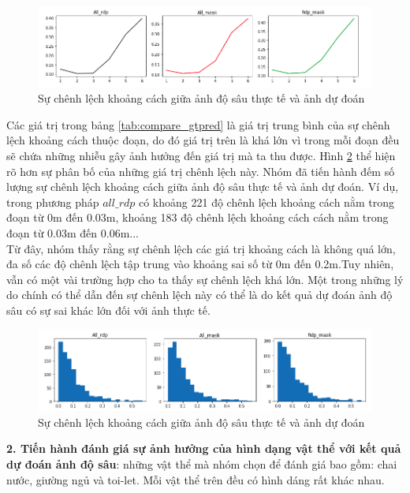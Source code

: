 \begin{center}
   \begin{figure}[H]
   \begin{center}
   \includegraphics[scale=0.55]{image/deviation}
   \end{center}
   \caption{Sự chênh lệch khoảng cách giữa ảnh độ sâu thực tế và ảnh dự đoán}
   \label{fig:deviation}
   \end{figure}
 \end{center}
 
 Các giá trị trong bảng \ref{tab:compare_gtpred} là giá trị trung bình của sự chênh lệch khoảng cách thuộc đoạn, do đó giá trị trên là khá lớn vì trong mỗi đoạn đều sẽ chứa những nhiễu gây ảnh hưởng đến giá trị mà ta thu được. Hình \ref{fig:distribution} thể hiện rõ hơn sự phân bố của những giá trị chênh lệch này. Nhóm đã tiến hành đếm số lượng sự chênh lệch khoảng cách giữa ảnh độ sâu thực tế và ảnh dự đoán.  Ví dụ, trong phương pháp $all\_rdp$ có khoảng 221 độ chênh lệch khoảng cách nằm trong đoạn từ 0m đến 0.03m, khoảng 183 độ chênh lệch khoảng cách cách nằm trong đoạn từ 0.03m đến 0.06m... \\
 
 Từ đây, nhóm thấy rằng sự chênh lệch các giá trị khoảng cách là không quá lớn, đa số các độ chênh lệch tập trung vào khoảng sai số từ 0m đến 0.2m.Tuy nhiên, vẫn có một vài trường hợp cho ta thấy sự chênh lệch khá lớn. Một trong những lý do chính có thể dẫn đến sự chênh lệch này có thể là do kết quả dự đoán ảnh độ sâu có sự sai khác lớn đối với ảnh thực tế.
 \begin{center}
   \begin{figure}[H]
   \begin{center}
   \includegraphics[scale=0.55]{image/distribution}
   \end{center}
   \caption{Sự chênh lệch khoảng cách giữa ảnh độ sâu thực tế và ảnh dự đoán}
   \label{fig:distribution}
   \end{figure}
 \end{center} 
 \hspace{.2cm}\textbf{2. Tiến hành đánh giá sự ảnh hưởng của hình dạng vật thể với kết quả dự đoán ảnh độ sâu}: những vật thể mà nhóm chọn để đánh giá bao gồm: chai nước, giường ngủ và toi-let. Mỗi vật thể trên đều có hình dáng rất khác nhau.\\
 
